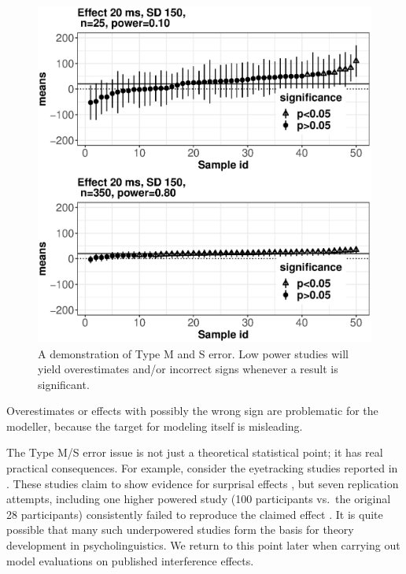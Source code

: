 \documentclass{cambridge7A}\usepackage[]{graphicx}\usepackage[]{color}
\makeatletter
\def\maxwidth{ %
  \ifdim\Gin@nat@width>\linewidth
    \linewidth
  \else
    \Gin@nat@width
  \fi
}
\newenvironment{knitrout}{}{} %
\makeatother
\begin{document}
\begin{figure}[!htbp]
\centering
\begin{knitrout}
\color{fgcolor}

{\centering \includegraphics[width=\maxwidth]{figures/fig-typemdemo-1} 

}



\end{knitrout}
\caption{A demonstration of  Type M and S error. Low power studies will yield overestimates and/or incorrect signs whenever a result is significant.}\label{fig:typemdemo}
\end{figure}

Overestimates or effects with possibly the wrong sign are problematic for
the modeller, because the target for modeling itself is
misleading. 

 
The Type M/S error issue is not just a theoretical statistical point; it has real
practical consequences. For example, consider the eyetracking studies
reported in \cite{LevyKeller2013}. These studies claim to show 
evidence for surprisal effects \citep{Hale2001,Levy2008}, but seven
replication attempts, including one higher powered study (100 participants vs.\ the original 28 participants) consistently failed to reproduce the claimed
effect \citep{VasishthMertzenJaegerGelman2018}. It is quite possible that 
many such underpowered studies form the basis for theory development in
psycholinguistics. We return to this point later when carrying out
model evaluations on published interference effects.
\end{document}
